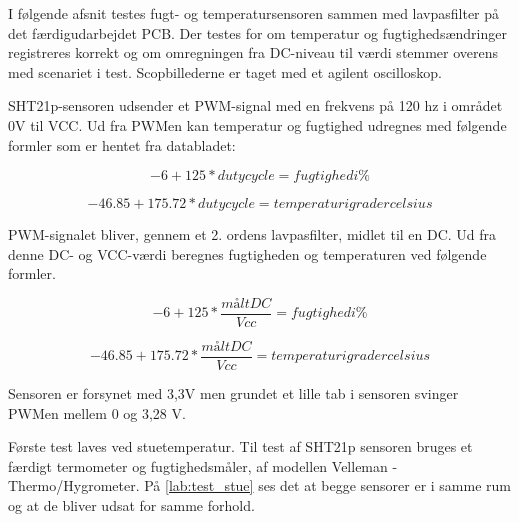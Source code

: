 

I følgende afsnit testes fugt- og temperatursensoren sammen med lavpasfilter på det færdigudarbejdet PCB. Der testes for om temperatur og fugtighedsændringer registreres korrekt og om omregningen fra DC-niveau til værdi stemmer overens med scenariet i test. Scopbillederne er taget med et agilent oscilloskop.

SHT21p-sensoren udsender et PWM-signal med en frekvens på 120 hz i området 0V til VCC. Ud fra PWMen kan temperatur og fugtighed udregnes med følgende formler som er hentet fra databladet:

\begin{equation}
-6+125*duty cycle= fugtighed i \%
\end{equation}

\begin{equation}
-46.85+175.72*duty cycle= temperatur i grader celsius
\end{equation}

PWM-signalet bliver, gennem et 2. ordens lavpasfilter, midlet til en DC. Ud fra denne DC-
og VCC-værdi beregnes fugtigheden og temperaturen ved følgende formler.


\begin{equation}
-6+125*\frac{målt DC}{Vcc}= fugtighed i \%
\end{equation}

\begin{equation}
-46.85+175.72*\frac{målt DC}{Vcc}=temperatur i grader celsius
\end{equation}

Sensoren er forsynet med 3,3V men grundet et lille tab i sensoren svinger PWMen mellem
0 og 3,28 V.




Første test laves ved stuetemperatur. Til test af SHT21p sensoren bruges et færdigt termometer og fugtighedsmåler, af modellen Velleman - Thermo/Hygrometer. På \ref{lab:test_stue} ses det at begge sensorer er i samme rum og at de bliver udsat for samme forhold. 

